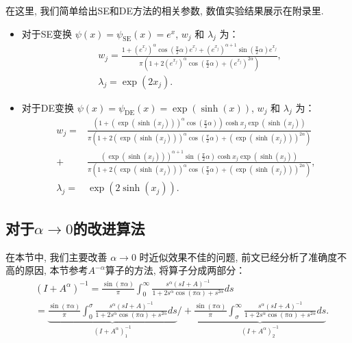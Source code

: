 在这里, 我们简单给出SE和DE方法的相关参数, 数值实验结果展示在附录里. 
\begin{itemize}
	\item 对于SE变换   $\psi(x)=\psi_{\mathrm{SE}}(x)=e^{ x}$, 
	$w_j$ 和 $\lambda_j$ 为：
	\begin{equation}
		\begin{aligned}
			&w_j=\frac{1+\left(e^{ x_j}\right)^{\alpha}\cos\left(\frac{\pi}{2} \alpha\right) e^{ x_j}+\left(e^{ x_j}\right)^{\alpha+1}\sin\left(\frac{\pi}{2}\alpha\right) e^{ x_j}}
			{\pi\left(1+2\left(e^{ x_j}\right)^{\alpha}\cos\left(\frac{\pi}{2} \alpha\right)+\left(e^{ x_j}\right)^{2\alpha}\right)},\\
			&\lambda_j=\exp({2 x_j}).
		\end{aligned}
		\label{wl_q_SE_im}
	\end{equation}
	\item 对于DE变换   $\psi(x)=\psi_{\mathrm{DE}}(x)=\exp(\sinh(x))$, 
	$w_j$ 和 $\lambda_j$ 为：
	\begin{equation}
		\begin{aligned}
			w_j=&\frac{\left(1+\left(\exp(\sinh(x_j))\right)^{\alpha}\cos\left(\frac{\pi}{2} \alpha\right)\right) \cosh x_j\exp\left(\sinh(x_j)\right)}
			{\pi\left(1+2\left(\exp(\sinh(x_j))\right)^{\alpha}\cos\left(\frac{\pi}{2} \alpha\right)+\left(\exp(\sinh(x_j))\right)^{2\alpha}\right)}\\
			+&\frac{\left(\exp(\sinh(x_j))\right)^{\alpha+1}\sin\left(\frac{\pi}{2}\alpha\right) \cosh x_j\exp\left(\sinh(x_j)\right)}
			{\pi\left(1+2\left(\exp(\sinh(x_j))\right)^{\alpha}\cos\left(\frac{\pi}{2} \alpha\right)+\left(\exp(\sinh(x_j))\right)^{2\alpha}\right)},\\
			\lambda_j=&\exp(2\sinh(x_j)).
		\end{aligned}
		\label{wl_q_DE_im}
	\end{equation}
\end{itemize}

\subsection{对于$\alpha \rightarrow 0$的改进算法}
在本节中, 我们主要改善 $\alpha \rightarrow 0$ 时近似效果不佳的问题, 前文已经分析了准确度不高的原因, 本节参考\(A^{-\alpha}\)算子的方法, 将算子分成两部分：
\begin{equation}
	\begin{aligned}
		&(I+{A}^{\alpha})^{-1}=\frac{\sin(\pi \alpha)}{\pi}\int_0^{\infty}\frac{s^{\alpha}(s{I}+{A})^{-1}}{1+2s^{\alpha}\cos(\pi\alpha)+s^{2\alpha}}ds\\
		&=\underbrace{\frac{\sin(\pi \alpha)}{\pi}\int_0^{\sigma}\frac{s^{\alpha}(s{I}+{A})^{-1}}{1+2s^{\alpha}\cos(\pi\alpha)+s^{2\alpha}}ds}_{(I+A^{\alpha})^{-1}_1}/
		+\underbrace{\frac{\sin(\pi \alpha)}{\pi}\int_{\sigma}^{\infty}\frac{s^{\alpha}(s{I}+{A})^{-1}}{1+2s^{\alpha}\cos(\pi\alpha)+s^{2\alpha}}ds}_{(I+A^{\alpha})^{-1}_2}.
	\end{aligned}
	\label{jg_q1}
\end{equation}

